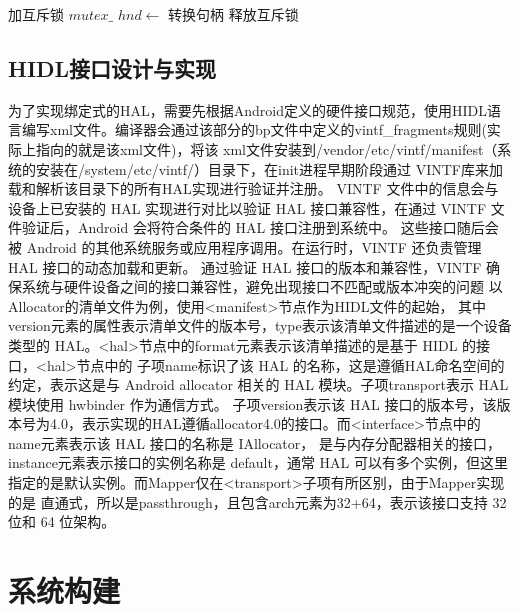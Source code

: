 \begin{algorithm}
\caption{GRALLOC\_DRIVER::RETAIN}
\label{algo:RETAIN}
\SetAlgoLined
{}
\BlankLine
加互斥锁 $mutex\_$\;
$hnd \leftarrow$ 转换句柄\;
释放互斥锁\;
\end{algorithm}

\subsection{HIDL接口设计与实现}
为了实现绑定式的HAL，需要先根据Android定义的硬件接口规范，使用HIDL语言编写xml文件。编译器会通过该部分的bp文件中定义的vintf\_fragments规则(实际上指向的就是该xml文件)，将该
xml文件安装到/vendor/etc/vintf/manifest（系统的安装在/system/etc/vintf/）目录下，在init进程早期阶段通过 VINTF库来加载和解析该目录下的所有HAL实现进行验证并注册。
VINTF 文件中的信息会与设备上已安装的 HAL 实现进行对比以验证 HAL 接口兼容性，在通过 VINTF 文件验证后，Android 会将符合条件的 HAL 接口注册到系统中。
这些接口随后会被 Android 的其他系统服务或应用程序调用。在运行时，VINTF 还负责管理 HAL 接口的动态加载和更新。
通过验证 HAL 接口的版本和兼容性，VINTF 确保系统与硬件设备之间的接口兼容性，避免出现接口不匹配或版本冲突的问题
以Allocator的清单文件为例，使用<manifest>节点作为HIDL文件的起始，
其中version元素的属性表示清单文件的版本号，type表示该清单文件描述的是一个设备类型的 HAL。<hal>节点中的format元素表示该清单描述的是基于 HIDL 的接口，<hal>节点中的
子项name标识了该 HAL 的名称，这是遵循HAL命名空间的约定，表示这是与 Android allocator 相关的 HAL 模块。子项transport表示 HAL 模块使用 hwbinder 作为通信方式。
子项version表示该 HAL 接口的版本号，该版本号为4.0，表示实现的HAL遵循allocator4.0的接口。而<interface>节点中的name元素表示该 HAL 接口的名称是 IAllocator，
是与内存分配器相关的接口，instance元素表示接口的实例名称是 default，通常 HAL 可以有多个实例，但这里指定的是默认实例。而Mapper仅在<transport>子项有所区别，由于Mapper实现的是
直通式，所以是passthrough，且包含arch元素为32+64，表示该接口支持 32 位和 64 位架构。

\section{系统构建}

